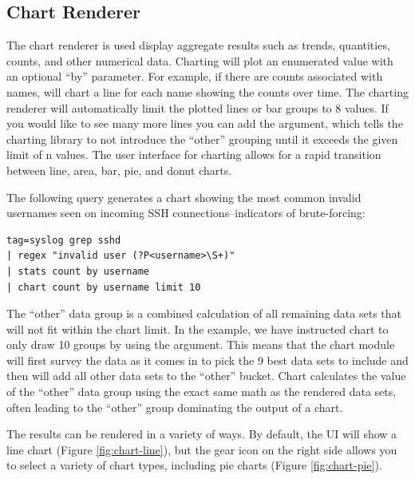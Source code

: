 \clearpage

\subsection{Chart Renderer}
The chart renderer is used display aggregate results such as trends,
quantities, counts, and other numerical data. Charting will plot an
enumerated value with an optional ``by'' parameter. For example, if
there are counts associated with names,  will
chart a line for each name showing the counts over time. The charting
renderer will automatically limit the plotted lines or bar groups to 8
values. If you would like to see many more lines you can add the 
argument, which tells the charting library
to not introduce the ``other'' grouping until it exceeds the given limit
of n values. The user interface for charting allows for a rapid
transition between line, area, bar, pie, and donut charts.

The following query generates a chart showing the most common invalid usernames seen on incoming SSH connections--indicators of brute-forcing:

\begin{Verbatim}[breaklines=true]
tag=syslog grep sshd 
| regex "invalid user (?P<username>\S+)" 
| stats count by username 
| chart count by username limit 10
\end{Verbatim}

The ``other'' data group is a combined calculation of all remaining data sets that will not fit within the chart limit.  In the example, we have instructed chart to only draw 10 groups by using the  argument. This means that the chart module will first survey the data as it comes in to pick the 9 best data sets to include and then will add all other data sets to the ``other'' bucket.  Chart calculates the value of the ``other'' data group using the exact same math as the rendered data sets, often leading to the ``other'' group dominating the output of a chart.

The results can be rendered in a variety of ways. By default, the UI will show a line chart (Figure \ref{fig:chart-line}), but the gear icon on the right side allows you to select a variety of chart types, including pie charts (Figure \ref{fig:chart-pie}).

